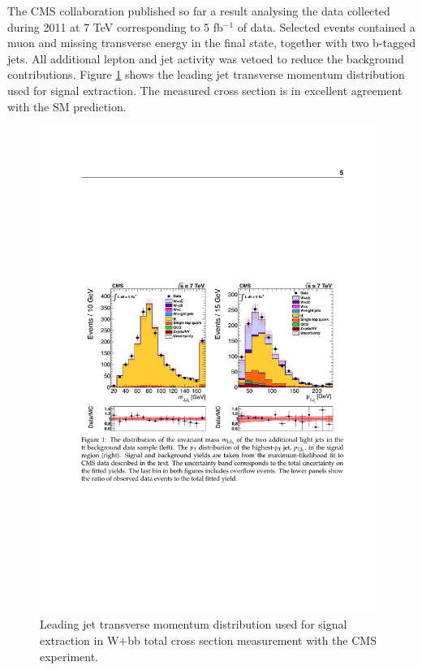 \par The CMS collaboration published so far a result analysing the data collected during 2011 at 7 TeV corresponding to 5 fb$^{-1}$ of data. Selected events contained a muon and missing transverse energy in the final state, together with two b-tagged jets. All additional lepton and jet activity was vetoed to reduce the background contributions. Figure \ref{fig:cms_total} shows the leading jet transverse momentum distribution used for signal extraction. The measured cross section is in excellent agreement with the SM prediction. \cite{Chatrchyan:2013uza}

\begin{figure}[htbp]
	\centering
		\includegraphics{Figures/cms_tot.pdf}
	\caption[CMS Wbb total cross section measurement]{Leading jet transverse momentum distribution used for signal extraction in W+bb  total cross section measurement with the CMS experiment. \cite{Chatrchyan:2013uza} }
	\label{fig:cms_total}
\end{figure}
